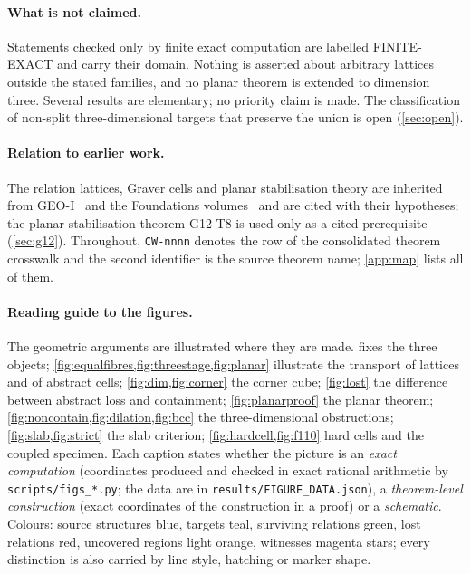 \paragraph{What is not claimed.} Statements checked only by finite exact computation are labelled FINITE-EXACT and carry their domain. Nothing is asserted about arbitrary lattices outside the stated families, and no planar theorem is extended to dimension three. Several results are elementary; no priority claim is made. The classification of non-split three-dimensional targets that preserve the union is open (\cref{sec:open}).

\paragraph{Relation to earlier work.} The relation lattices, Graver cells and planar stabilisation theory are inherited from GEO-I~\cite{GEOI} and the Foundations volumes~\cite{FoundI,FoundII,RefColl} and are cited with their hypotheses; the planar stabilisation theorem G12-T8 is used only as a cited prerequisite (\cref{sec:g12}). Throughout, \texttt{CW-nnnn} denotes the row of the consolidated theorem crosswalk and the second identifier is the source theorem name; \cref{app:map} lists all of them.

\paragraph{Reading guide to the figures.} The geometric arguments are illustrated where they are made.  fixes the three objects; \cref{fig:equalfibres,fig:threestage,fig:planar} illustrate the transport of lattices and of abstract cells; \cref{fig:dim,fig:corner} the corner cube; \cref{fig:lost} the difference between abstract loss and containment; \cref{fig:planarproof} the planar theorem; \cref{fig:noncontain,fig:dilation,fig:bcc} the three-dimensional obstructions; \cref{fig:slab,fig:strict} the slab criterion; \cref{fig:hardcell,fig:f110} hard cells and the coupled specimen. Each caption states whether the picture is an \emph{exact computation} (coordinates produced and checked in exact rational arithmetic by \texttt{scripts/figs\_*.py}; the data are in \texttt{results/FIGURE\_DATA.json}), a \emph{theorem-level construction} (exact coordinates of the construction in a proof) or a \emph{schematic}. Colours: source structures blue, targets teal, surviving relations green, lost relations red, uncovered regions light orange, witnesses magenta stars; every distinction is also carried by line style, hatching or marker shape.
